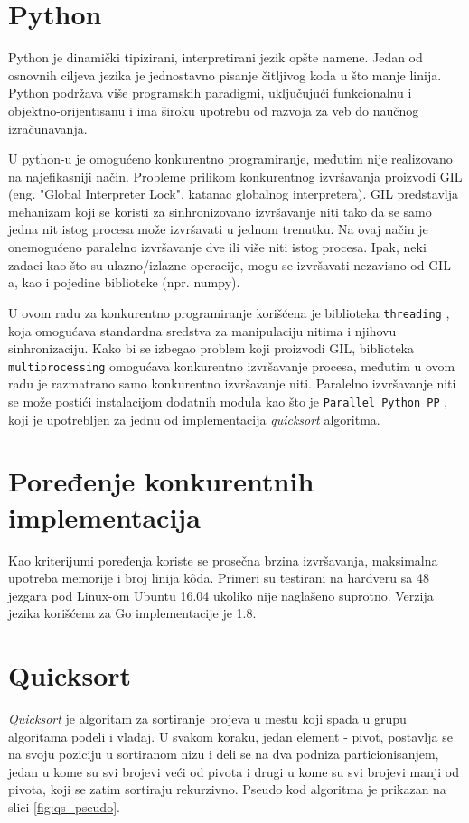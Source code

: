 \documentclass[12pt,oneside]{memoir}
\begin{document}
\section{Python}

Python je dinamički tipizirani, interpretirani jezik opšte namene. Jedan od osnovnih ciljeva jezika je jednostavno pisanje čitljivog koda u što manje linija. Python podržava više programskih paradigmi, uključujući funkcionalnu i objektno-orijentisanu i ima široku upotrebu od razvoja za veb do naučnog izračunavanja. 

\label{gil}
U python-u je omogućeno konkurentno programiranje, međutim nije realizovano na najefikasniji način. Probleme prilikom konkurentnog izvršavanja proizvodi GIL (eng. "Global Interpreter Lock", katanac globalnog interpretera). GIL predstavlja mehanizam koji se koristi za sinhronizovano izvršavanje niti tako da se samo jedna nit istog procesa može izvršavati u jednom trenutku. Na ovaj način je onemogućeno paralelno izvršavanje dve ili više niti istog procesa. Ipak, neki zadaci kao što su ulazno/izlazne operacije, mogu se izvršavati nezavisno od GIL-a, kao i pojedine biblioteke (npr. numpy).

U ovom radu za konkurentno programiranje korišćena je biblioteka \texttt{threading} \cite{thr}, koja omogućava standardna sredstva za manipulaciju nitima i njihovu sinhronizaciju. Kako bi se izbegao problem koji proizvodi GIL, biblioteka \texttt{multiprocessing} omogućava konkurentno izvršavanje procesa, međutim u ovom radu je razmatrano samo konkurentno izvršavanje niti. Paralelno izvršavanje niti se može postići instalacijom dodatnih modula kao što je \texttt{Parallel Python PP} \cite{pp}, koji je upotrebljen za jednu od implementacija \textit{quicksort} algoritma.

\section{Poređenje konkurentnih implementacija}
Kao kriterijumi poređenja koriste se prosečna brzina izvršavanja, maksimalna upotreba memorije i broj linija k\^{o}da. Primeri su testirani na hardveru sa 48 jezgara pod Linux-om Ubuntu 16.04 ukoliko nije naglašeno suprotno. Verzija jezika korišćena za Go implementacije je 1.8.

\section{Quicksort}
\textit{Quicksort} je algoritam za sortiranje brojeva u mestu koji spada u grupu algoritama podeli i vladaj. U svakom koraku, jedan element - pivot, postavlja se na svoju poziciju u sortiranom nizu i deli se na dva podniza particionisanjem, jedan u kome su svi brojevi veći od pivota i drugi u kome su svi brojevi manji od pivota, koji se zatim sortiraju rekurzivno.  Pseudo kod algoritma je prikazan na slici \ref{fig:qs_pseudo}. 
\end{document}
